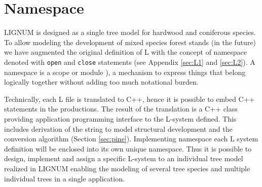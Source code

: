 \section{Namespace}\label{sec:namespace}
LIGNUM is designed as a  single tree model for hardwood and coniferous
species.  To  allow modeling the  development of mixed  species forest
stands (in the future) we  have augmented the original definition of L
with  the   concept  of  namespace  denoted   with  \texttt{open}  and
\texttt{close}    statements    (see    Appendix   \ref{sec:L1}    and
\ref{sec:L2}).     A    namespace     is    a    scope    or    module
\citep{stroustrup:97}),  a  mechanism to  express  things that  belong
logically together without adding too much notational burden.
 
Technically, each L file is translated to C++, hence it is possible to
embed C++ statements in the productions. The result of the translation
is  a C++  class providing  application programming  interface  to the
L-system  defined. This  includes derivation  of the  string  to model
structural   development  and   the   conversion  algorithm   (Section
\ref{sec:pine}).  Implementing namespace each L system definition will
be  enclosed into its  own unique  namespace. Thus  it is  possible to
design, implement and assign a specific L-system to an individual tree
model realized in LIGNUM enabling the modeling of several tree species
and multiple individual trees  in a single application.

